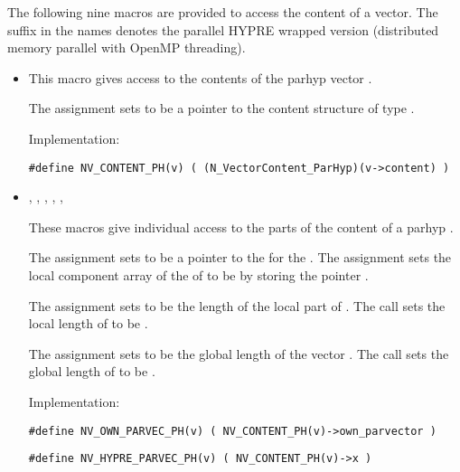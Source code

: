 The following nine macros are provided to access the content of a {\nvecph}
vector. The suffix  in the names denotes the parallel HYPRE
wrapped version (distributed memory parallel with OpenMP threading).
\begin{itemize}

\item 

  This macro gives access to the contents of the parhyp
  vector .
  
  The assignment  sets       
   to be a pointer to the  content    
  structure of type .
  
  Implementation:
  
  \verb|#define NV_CONTENT_PH(v) ( (N_VectorContent_ParHyp)(v->content) )|
  
\item 
  , , 
  , , 
  , 
  
  These macros give individual access to the parts of    
  the content of a parhyp .                        

  The assignment  sets  to be     
  a pointer to the   for the  . 
  The assignment  sets the local component array of 
  the   of  to be  by storing the pointer 
  .              
  
  The assignment  sets  to be     
  the length of the local part of . 
  The call  sets      
  the local length of  to be .
  
  The assignment  sets  to  
  be the global length of the vector .                    
  The call  sets the global       
  length of  to be .
  
  Implementation:
  
  \verb|#define NV_OWN_PARVEC_PH(v) ( NV_CONTENT_PH(v)->own_parvector )|

  \verb|#define NV_HYPRE_PARVEC_PH(v) ( NV_CONTENT_PH(v)->x )|


\end{itemize}
